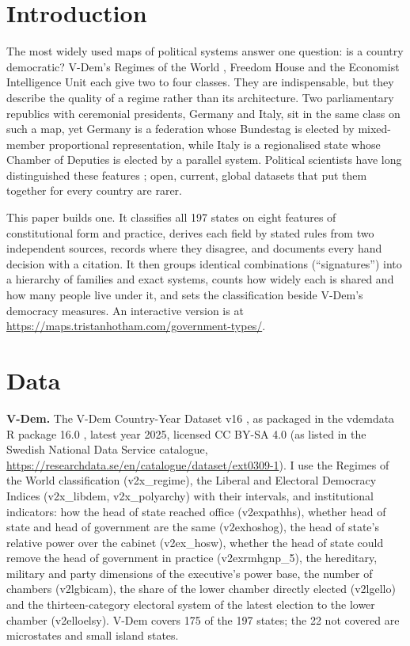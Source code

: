 \documentclass[11pt,a4paper]{article}
\begin{document}
\section{Introduction}
The most widely used maps of political systems answer one question: is a country democratic? V-Dem's Regimes of the World \citep{row}, Freedom House and the Economist Intelligence Unit each give two to four classes. They are indispensable, but they describe the quality of a regime rather than its architecture. Two parliamentary republics with ceremonial presidents, Germany and Italy, sit in the same class on such a map, yet Germany is a federation whose Bundestag is elected by mixed-member proportional representation, while Italy is a regionalised state whose Chamber of Deputies is elected by a parallel system. Political scientists have long distinguished these features \citep{lijphart,shugartcarey,elgie2011,reynolds}; open, current, global datasets that put them together for every country are rarer.

This paper builds one. It classifies all 197 states on eight features of constitutional form and practice, derives each field by stated rules from two independent sources, records where they disagree, and documents every hand decision with a citation. It then groups identical combinations (``signatures'') into a hierarchy of families and exact systems, counts how widely each is shared and how many people live under it, and sets the classification beside V-Dem's democracy measures. An interactive version is at \url{https://maps.tristanhotham.com/government-types/}.

\section{Data}
\textbf{V-Dem.} The V-Dem Country-Year Dataset v16 \citep{vdem}, as packaged in the vdemdata R package 16.0 \citep{vdemdata}, latest year 2025, licensed CC BY-SA 4.0 (as listed in the Swedish National Data Service catalogue, \url{https://researchdata.se/en/catalogue/dataset/ext0309-1}). I use the Regimes of the World classification (v2x\_regime), the Liberal and Electoral Democracy Indices (v2x\_libdem, v2x\_polyarchy) with their intervals, and institutional indicators: how the head of state reached office (v2expathhs), whether head of state and head of government are the same (v2exhoshog), the head of state's relative power over the cabinet (v2ex\_hosw), whether the head of state could remove the head of government in practice (v2exrmhgnp\_5), the hereditary, military and party dimensions of the executive's power base, the number of chambers (v2lgbicam), the share of the lower chamber directly elected (v2lgello) and the thirteen-category electoral system of the latest election to the lower chamber (v2elloelsy). V-Dem covers 175 of the 197 states; the 22 not covered are microstates and small island states.
\end{document}
